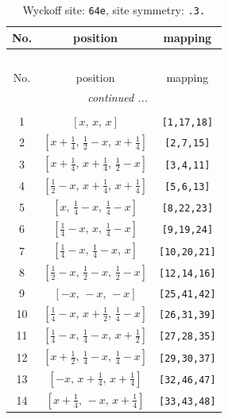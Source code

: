 \documentclass[fleqn,8pt]{jsarticle}
\begin{document}
\begin{longtable}{ccc}
\caption{Wyckoff site: {\tt 64e}, site symmetry: {\tt .3.}}
 \\
 \hline \hline
No. & position & mapping \\ \hline \endfirsthead

\multicolumn{2}{l}{\tablename\ \thetable{}} \\
 \hline \hline
No. & position & mapping \\ \hline \endhead

 \hline \hline
\multicolumn{2}{r}{\footnotesize\it continued ...} \\ \endfoot

 \hline \hline
\multicolumn{2}{r}{} \\ \endlastfoot

1 & $\left[ x,\, x,\, x \right]$ & {\tt [1,17,18]} \\ \hline
2 & $\left[ x + \frac{1}{4},\, \frac{1}{2} - x,\, x + \frac{1}{4} \right]$ & {\tt [2,7,15]} \\ \hline
3 & $\left[ x + \frac{1}{4},\, x + \frac{1}{4},\, \frac{1}{2} - x \right]$ & {\tt [3,4,11]} \\ \hline
4 & $\left[ \frac{1}{2} - x,\, x + \frac{1}{4},\, x + \frac{1}{4} \right]$ & {\tt [5,6,13]} \\ \hline
5 & $\left[ x,\, \frac{1}{4} - x,\, \frac{1}{4} - x \right]$ & {\tt [8,22,23]} \\ \hline
6 & $\left[ \frac{1}{4} - x,\, x,\, \frac{1}{4} - x \right]$ & {\tt [9,19,24]} \\ \hline
7 & $\left[ \frac{1}{4} - x,\, \frac{1}{4} - x,\, x \right]$ & {\tt [10,20,21]} \\ \hline
8 & $\left[ \frac{1}{2} - x,\, \frac{1}{2} - x,\, \frac{1}{2} - x \right]$ & {\tt [12,14,16]} \\ \hline
9 & $\left[ - x,\, - x,\, - x \right]$ & {\tt [25,41,42]} \\ \hline
10 & $\left[ \frac{1}{4} - x,\, x + \frac{1}{2},\, \frac{1}{4} - x \right]$ & {\tt [26,31,39]} \\ \hline
11 & $\left[ \frac{1}{4} - x,\, \frac{1}{4} - x,\, x + \frac{1}{2} \right]$ & {\tt [27,28,35]} \\ \hline
12 & $\left[ x + \frac{1}{2},\, \frac{1}{4} - x,\, \frac{1}{4} - x \right]$ & {\tt [29,30,37]} \\ \hline
13 & $\left[ - x,\, x + \frac{1}{4},\, x + \frac{1}{4} \right]$ & {\tt [32,46,47]} \\ \hline
14 & $\left[ x + \frac{1}{4},\, - x,\, x + \frac{1}{4} \right]$ & {\tt [33,43,48]} \\ \hline

\end{longtable}
\end{document}
